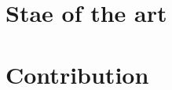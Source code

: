 \documentclass[12pt]{book}
\begin{document}


\mainmatter

\fancyhead[RO]{\leftmark}
\fancyhead[LE]{\textsc{\chaptername~\thechapter}}




\part{Stae of the art}


\part{Contribution}



\printbibliography
{}
\end{document}
